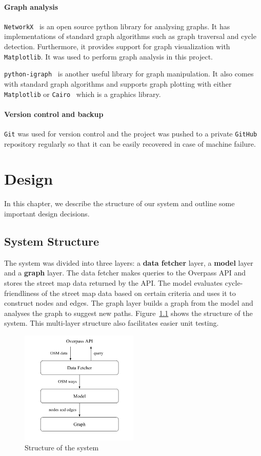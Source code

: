 \documentclass[12pt,a4paper]{report}
\begin{document}
\subsubsection*{Graph analysis}
\texttt{NetworkX}~\cite{SciPyProceedings_11} is an open source python library for analysing graphs. It has implementations of standard graph algorithms such as graph traversal and cycle detection. Furthermore, it provides support for graph visualization with \texttt{Matplotlib}. It was used to perform graph analysis in this project.

\texttt{python-igraph}~\cite{igraph} is another useful library for graph manipulation. It also comes with standard graph algorithms and supports graph plotting with either \texttt{Matplotlib} or \texttt{Cairo}~\cite{cairo} which is a graphics library.

\subsubsection*{Version control and backup}
\texttt{Git} was used for version control and the project was pushed to a private \texttt{GitHub} repository regularly so that it can be easily recovered in case of machine failure.

\chapter{Design}\label{chapter:design}
In this chapter, we describe the structure of our system and outline some important design decisions.

\section{System Structure}
The system was divided into three layers: a \textbf{data fetcher} layer, a \textbf{model} layer and a \textbf{graph} layer. The data fetcher makes queries to the Overpass API and stores the street map data returned by the API. The model evaluates cycle-friendliness of the street map data based on certain criteria and uses it to construct nodes and edges. The graph layer builds a graph from the model and analyses the graph to suggest new paths. Figure~\ref{fig:structure} shows the structure of the system. This multi-layer structure also facilitates easier unit testing.

\begin{figure}[ht]
    \centering
    \includegraphics[width=0.5\textwidth]{diss_images/design/multi_layer.png}
    \caption{Structure of the system}
    \label{fig:structure}
\end{figure}
\end{document}
